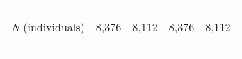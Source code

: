 \begin{center}
\begin{tabular}{lcccccccc}
\textit{N} (individuals) & \multicolumn{2}{c}{\begin{bf}8,376\end{bf}} & \multicolumn{2}{c}{\begin{rm}8,112\end{rm}} & \multicolumn{2}{c}{\begin{bf}8,376\end{bf}} & \multicolumn{2}{c}{\begin{rm}8,112\end{rm}}\\
\noalign{\smallskip}\hline\end{tabular}\\
\end{center}
